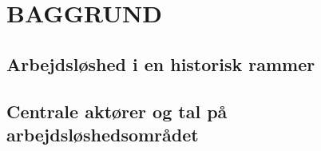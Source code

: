 

\chapter{BAGGRUND} \label{baggrund}




\section{Arbejdsløshed i en historisk rammer \label{}}




\section{Centrale aktører og tal på arbejdsløshedsområdet \label{}}


